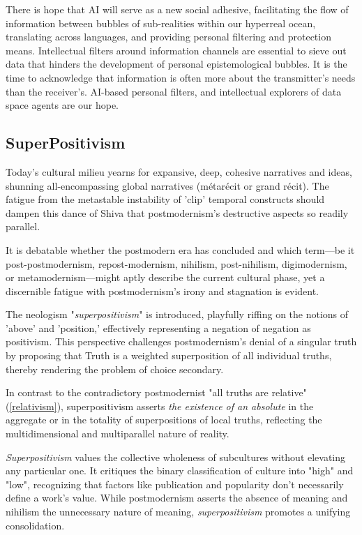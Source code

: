 \documentclass[11pt,a4]{article}
\begin{document}
    There is hope that AI will serve as a new social adhesive, facilitating the flow of information
    between bubbles of sub-realities within our hyperreal ocean, translating across languages, and
    providing personal filtering and protection means. Intellectual filters around information channels
    are essential to sieve out data that hinders the development of personal epistemological bubbles.
    It is the time to acknowledge that information is often more about the transmitter's needs than the
    receiver's.  AI-based personal filters, and intellectual explorers of data space agents are our hope.

 \subsection{SuperPositivism}

    Today's cultural
    milieu yearns for expansive, deep, cohesive narratives and ideas, shunning all-encompassing
    global narratives (métarécit or grand récit). The fatigue from the metastable
    instability of 'clip' temporal constructs should dampen this dance of Shiva that
    postmodernism's destructive aspects so readily parallel.

    It is debatable whether the postmodern era has concluded and which term---be it post-postmodernism,
    repost-modernism, nihilism, post-nihilism, digimodernism, or metamodernism---might aptly describe
    the current cultural phase, yet a discernible fatigue with
    postmodernism's irony and stagnation is evident.

    The neologism "\textit{superpositivism}" is introduced, playfully riffing on the notions of 'above'
    and 'position,' effectively representing a negation of negation as positivism. This perspective
    challenges postmodernism's denial of a singular truth by proposing that Truth is a weighted
    superposition of all individual truths, thereby rendering the problem of choice secondary.

    In contrast to the contradictory postmodernist "all truths are relative" (\ref{relativism}),
    superpositivism asserts \textit{the existence of an absolute} in the aggregate or in the
    totality of superpositions of local truths, reflecting the multidimensional and multiparallel
    nature of reality.

 \textit{Superpositivism} values the collective wholeness of subcultures without elevating any
    particular one. It critiques the binary classification of culture into "high" and "low",
    recognizing that factors like publication and popularity don't necessarily define a work's value.
    While postmodernism asserts the absence of meaning and nihilism the unnecessary nature of
    meaning, \textit{superpositivism} promotes a unifying consolidation.








\end{document}
